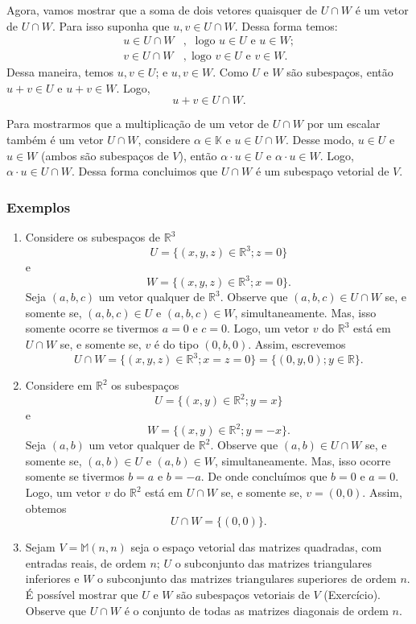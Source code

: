 Agora, vamos mostrar que a soma de dois vetores quaisquer de $U \cap W$ é um vetor de  $U \cap W$.  Para isso suponha que $u,v \in U\cap W$. Dessa forma temos:
\begin{align*}
u\in U\cap W&, \; \text{ logo $u \in U$ e $u \in W$};\\
v\in U\cap W &, \; \text{logo  $v \in U$ e $v \in W$}.
\end{align*}
Dessa maneira, temos  $u, v \in U$;   e $u,v \in W$. Como $U$ e $W$ são subespaços, então $u+ v \in U$  e $u+v \in W$. Logo, $$u+ v \in U \cap W. $$

Para mostrarmos que a multiplicação de um vetor de $U\cap W$ por um escalar  também é um vetor $U\cap W$,  considere $\alpha \in \mathbb{K}$  e $u \in U\cap W$.  Desse modo,  $u\in U$ e $u \in W$  (ambos são subespaços de $V$), então   $\alpha \cdot  u \in U$ e $\alpha \cdot  u \in W$.
Logo, $\alpha \cdot  u\in U\cap W$. Dessa forma concluimos que $U\cap W$ é um subespaço vetorial de $V$.

\subsubsection{\textbf{Exemplos}}
\begin{enumerate}
\item Considere os subespaços de $\mathbb{R}^3$
$$ U= \{(x,y,z) \in \mathbb{R}^3 ; z=0\} $$ e  $$ W= \{(x,y,z) \in \mathbb{R}^3 ; x=0\}.  $$ Seja $(a, b, c)$ um vetor qualquer de $\mathbb{R}^3$. Observe que  $(a, b,c ) \in U\cap W$ se, e somente se,  $(a, b, c) \in U$ e $(a, b, c) \in W$, simultaneamente. Mas, isso somente ocorre se tivermos  $a=0$   e $c=0$. Logo, um  vetor $v$ do $\mathbb{R}^3$ está em $U \cap W$ se, e somente se, $v$ é do tipo $(0, b, 0)$. Assim, escrevemos $$U \cap W=\{(x, y, z) \in\mathbb{R}^3; x=z=0 \}=\{ (0,y,0); y \in \mathbb{R}\}.$$


\item Considere em $\mathbb{R}^2$ os subespaços
$$ U= \{(x,y) \in \mathbb{R}^2 ; y=x\} $$ e  $$ W= \{(x,y) \in \mathbb{R}^2 ; y=-x\}.  $$ Seja $(a, b)$ um vetor qualquer de $\mathbb{R}^2$. Observe que  $(a, b ) \in U\cap W$ se, e somente se,  $(a, b) \in U$ e $(a, b) \in W$, simultaneamente. Mas, isso ocorre somente  se tivermos  $b=a$   e $b=-a$. De onde concluímos que $b=0$ e $a=0$.  Logo, um  vetor $v$ do $\mathbb{R}^2$ está em $U \cap W$ se, e somente se, $v=(0, 0)$. Assim, obtemos $$U \cap W=\{(0,0) \}.$$

\item  Sejam $V= \mathbb{M}(n,n)$ seja o espaço vetorial  das matrizes quadradas, com entradas reais,  de ordem $n$; $U$ o subconjunto  das matrizes triangulares inferiores e $W$ o subconjunto das matrizes triangulares superiores de ordem $n$.  É possível mostrar que $U$ e $W$ são subespaços vetoriais de $V$ (Exercício).  Observe que $U \cap W$ é o conjunto de todas as matrizes diagonais de ordem $n$.
\end{enumerate}

